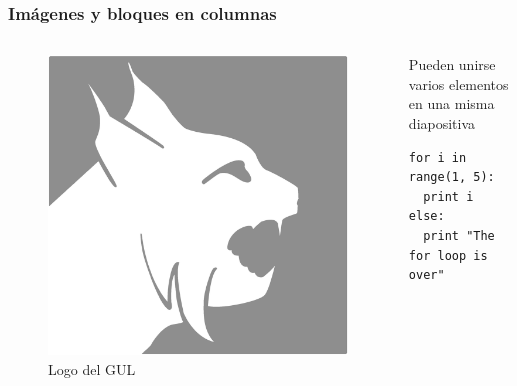 \documentclass[aspectratio=43]{beamer}
\begin{document}
\begin{frame}[fragile]
    \frametitle{Imágenes y bloques en columnas}
    \begin{columns}
            \begin{figure}
                \includegraphics[scale=0.5]{img/logo1.png}
                \caption{Logo del GUL}
            \end{figure}
            \begin{block}{Pueden unirse varios elementos en una misma diapositiva} %
                \begin{verbatim}
for i in range(1, 5):
  print i
else:
  print "The for loop is over"
                \end{verbatim}
            \end{block}
    \end{columns}
\end{frame}
\end{document}
